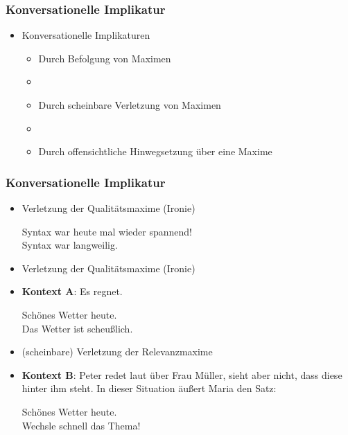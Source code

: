 \begin{frame}
\frametitle{Konversationelle Implikatur}

\begin{itemize}
	\item Konversationelle Implikaturen
	
\vspace{5mm}
	
	\begin{itemize}
		\item Durch Befolgung von Maximen
		\item[]
		\item Durch scheinbare Verletzung von Maximen
		\item[]
		\item Durch offensichtliche Hinwegsetzung über eine Maxime
	\end{itemize}
	
\end{itemize}

\end{frame}




\begin{frame}
\frametitle{Konversationelle Implikatur}

\begin{itemize}

	\item Verletzung der Qualitätsmaxime (Ironie)

	\ea Syntax war heute mal wieder spannend!\\
	\implc Syntax war langweilig.
	\z

\medskip

	\item Verletzung der Qualitätsmaxime (Ironie)
	
	\item[] \textbf{Kontext A}: Es regnet.
	
	\ea Schönes Wetter heute.\\
	\implc Das Wetter ist scheu\ss{}lich.
	\z
	
\medskip	
	
	\item (scheinbare) Verletzung der Relevanzmaxime
	
	\item[] \textbf{Kontext B}: Peter redet laut über Frau Müller, sieht aber nicht, dass diese hinter ihm steht. In dieser Situation äu\ss{}ert Maria den Satz:
	
	\ea Schönes Wetter heute.\\
	\implc Wechsle schnell das Thema! 
	\z	
		
	\end{itemize}

\end{frame}


